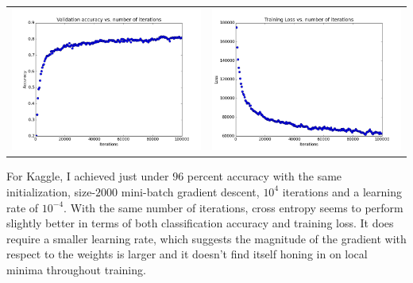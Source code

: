 \documentclass[11pt]{article}
\newcommand{\asdf}{\newline\newline}
\begin{document}
\begin{tabular}{cc}
\includegraphics[scale=0.4]{images/accuracy_cross} & \includegraphics[scale=0.4]{images/loss_cross} \\
\end{tabular}\asdf
For Kaggle, I achieved just under $96$ percent accuracy with the same initialization, size-$2000$ mini-batch gradient descent, $10^4$ iterations and a learning rate of $10^{-4}$.\asdf
With the same number of iterations, cross entropy seems to perform slightly better in terms of both classification accuracy and training loss. It does require a smaller learning rate, which suggests the magnitude of the gradient with respect to the weights is larger and it doesn't find itself honing in on local minima throughout training.
\end{document}
